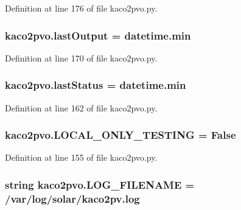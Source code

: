 Definition at line 176 of file kaco2pvo.\+py.

\hypertarget{namespacekaco2pvo_a1df621e1e0c27a48983d7e0b7c6beab3}{}
\subsubsection[{last\+Output}]{\setlength{\rightskip}{0pt plus 5cm}kaco2pvo.\+last\+Output = datetime.\+min}\label{namespacekaco2pvo_a1df621e1e0c27a48983d7e0b7c6beab3}


Definition at line 170 of file kaco2pvo.\+py.

\hypertarget{namespacekaco2pvo_a7c3c6c8c268272c74c596e1ab4e62db8}{}
\subsubsection[{last\+Status}]{\setlength{\rightskip}{0pt plus 5cm}kaco2pvo.\+last\+Status = datetime.\+min}\label{namespacekaco2pvo_a7c3c6c8c268272c74c596e1ab4e62db8}


Definition at line 162 of file kaco2pvo.\+py.

\hypertarget{namespacekaco2pvo_abc161ff89f5e21fa7d1b55b5c7d63fcf}{}
\subsubsection[{L\+O\+C\+A\+L\+\_\+\+O\+N\+L\+Y\+\_\+\+T\+E\+S\+T\+I\+N\+G}]{\setlength{\rightskip}{0pt plus 5cm}kaco2pvo.\+L\+O\+C\+A\+L\+\_\+\+O\+N\+L\+Y\+\_\+\+T\+E\+S\+T\+I\+N\+G = False}\label{namespacekaco2pvo_abc161ff89f5e21fa7d1b55b5c7d63fcf}


Definition at line 155 of file kaco2pvo.\+py.

\hypertarget{namespacekaco2pvo_ae7051b1e33f9f50f3ebaa0d7599508b0}{}
\subsubsection[{L\+O\+G\+\_\+\+F\+I\+L\+E\+N\+A\+M\+E}]{\setlength{\rightskip}{0pt plus 5cm}string kaco2pvo.\+L\+O\+G\+\_\+\+F\+I\+L\+E\+N\+A\+M\+E = \textquotesingle{}/var/log/solar/kaco2pv.\+log\textquotesingle{}}\label{namespacekaco2pvo_ae7051b1e33f9f50f3ebaa0d7599508b0}


